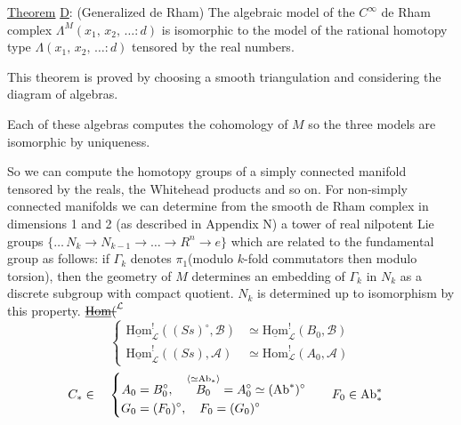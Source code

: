 \uline{Theorem} \uline{D}: \quad (Generalized de Rham) The algebraic model of the \(C^{\infty}\) de Rham complex \(\Lambda^{M}(x_{1},\,x_{2},\,\ldots : d)\) is isomorphic to the model of the rational homotopy type \(\Lambda(x_{1},\,x_{2},\,\ldots : d)\) tensored by the real numbers.

This theorem is proved by choosing a smooth triangulation and considering the diagram of algebras.


Each of these algebras computes the cohomology of \(M\) so the three models are isomorphic by uniqueness.

So we can compute the homotopy groups of a simply connected manifold tensored by the reals, the Whitehead products and so on. For non-simply connected manifolds we can determine from the smooth de Rham complex in dimensions 1 and 2 (as described in Appendix N) a tower of real nilpotent Lie groups \(\{\ldots\,N_{k}\to N_{k-1}\to\ldots\to R^{n}\to e\}\) which are related to the fundamental group as follows: if \(\Gamma_{k}\) denotes \(\pi_{1}\)(modulo \(k\)-fold commutators then modulo torsion), then the geometry of \(M\) determines an embedding of \(\Gamma_{k}\) in \(N_{k}\) as a discrete subgroup with compact quotient. \(N_{k}\) is determined up to isomorphism by this property.
\(\deleted{\underline{\mathrm{Hom}}(}^{\mathcal L}\)
\[
\left\{\begin{aligned}
\underline{\mathrm{Hom}}^{!}_{\mathcal L}((Ss)^\circ,\mathcal B)&\simeq\underline{\mathrm{Hom}}^{!}_{\mathcal L}(B_0,\mathcal B)\\
\underline{\mathrm{Hom}}^{!}_{\mathcal L}((Ss),\mathcal A)&\simeq\mathrm{Hom}^{!}_{\mathcal L}(A_0,\mathcal A)
\end{aligned}\right.
\]
\[
\begin{aligned}
C_* \in\quad
\left\{\begin{aligned}
A_0&=B_0^\circ,\quad \overset{\inserted{\simeq\mathrm{Ab}_*}}{B_0}=A_0^\circ\simeq(\mathrm{Ab}^*)^\circ\\
G_0&=(F_0)^\circ,\quad F_0=(G_0)^\circ
\end{aligned}\right.
&\qquad F_0\in\mathrm{Ab}^{*}_{*}
\end{aligned}
\]

